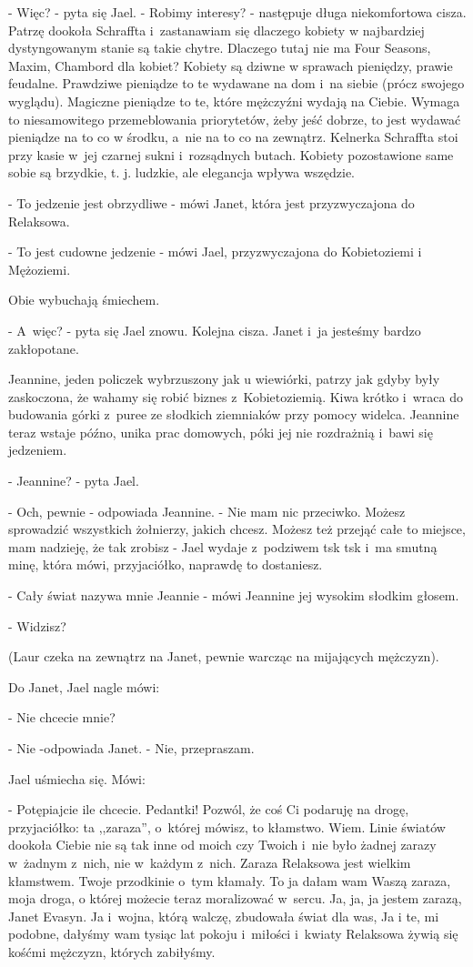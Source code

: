\documentclass[oneside,polish,12pt,sfheadings]{mwbk}
\begin{document}
- Więc? - pyta się Jael. - Robimy interesy? - następuje długa niekomfortowa
cisza. Patrzę dookoła Schraffta i~zastanawiam się dlaczego kobiety
w najbardziej dystyngowanym stanie są takie chytre. Dlaczego tutaj
nie ma Four Seasons, Maxim, Chambord dla kobiet? Kobiety są dziwne
w sprawach pieniędzy, prawie feudalne. Prawdziwe pieniądze to te wydawane
na dom i~na siebie (prócz swojego wyglądu). Magiczne pieniądze to
te, które mężczyźni wydają na Ciebie. Wymaga to niesamowitego przemeblowania
priorytetów, żeby jeść dobrze, to jest wydawać pieniądze na to co
w środku, a~nie na to co na zewnątrz. Kelnerka Schraffta stoi przy
kasie w~jej czarnej sukni i~rozsądnych butach. Kobiety pozostawione
same sobie są brzydkie, t. j. ludzkie, ale elegancja wpływa wszędzie.

- To jedzenie jest obrzydliwe - mówi Janet, która jest przyzwyczajona
do Relaksowa.

- To jest cudowne jedzenie - mówi Jael, przyzwyczajona do Kobietoziemi
i Mężoziemi.

Obie wybuchają śmiechem.

- A~więc? - pyta się Jael znowu. Kolejna cisza. Janet i~ja jesteśmy
bardzo zakłopotane.

Jeannine, jeden policzek wybrzuszony jak u wiewiórki, patrzy jak gdyby
były zaskoczona, że wahamy się robić biznes z~Kobietoziemią. Kiwa
krótko i~wraca do budowania górki z~puree ze słodkich ziemniaków przy
pomocy widelca. Jeannine teraz wstaje późno, unika prac domowych,
póki jej nie rozdrażnią i~bawi się jedzeniem.

- Jeannine? - pyta Jael.

- Och, pewnie - odpowiada Jeannine. - Nie mam nic przeciwko. Możesz
sprowadzić wszystkich żołnierzy, jakich chcesz. Możesz też przejąć
całe to miejsce, mam nadzieję, że tak zrobisz - Jael wydaje z~podziwem
tsk tsk i~ma smutną minę, która mówi, przyjaciółko, naprawdę to dostaniesz.

- Cały świat nazywa mnie Jeannie - mówi Jeannine jej wysokim słodkim
głosem.

- Widzisz?

(Laur czeka na zewnątrz na Janet, pewnie warcząc na mijających mężczyzn).

Do Janet, Jael nagle mówi: 

- Nie chcecie mnie?

- Nie -odpowiada Janet. - Nie, przepraszam.

Jael uśmiecha się. Mówi: 

- Potępiajcie ile chcecie. Pedantki! Pozwól,
że coś Ci podaruję na drogę, przyjaciółko: ta ,,zaraza'', o~której
mówisz, to kłamstwo. Wiem. Linie światów dookoła Ciebie nie są tak
inne od moich czy Twoich i~nie było żadnej zarazy w~żadnym z~nich,
nie w~każdym z~nich. Zaraza Relaksowa jest wielkim kłamstwem. Twoje
przodkinie o~tym kłamały. To ja dałam wam Waszą zaraza, moja droga,
o której możecie teraz moralizować w~sercu. Ja, ja, ja jestem zarazą,
Janet Evasyn. Ja i~wojna, którą walczę, zbudowała świat dla was, Ja
i te, mi podobne, dałyśmy wam tysiąc lat pokoju i~miłości i~kwiaty
Relaksowa żywią się kośćmi mężczyzn, których zabiłyśmy.
\end{document}
